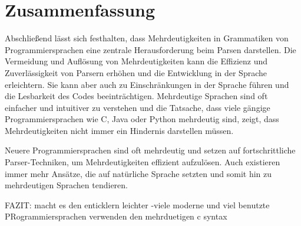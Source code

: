 \documentclass[runningheads]{llncs}
\begin{document}
	\section{Zusammenfassung}\label{sec:zusammenfassung}

	Abschließend lässt sich festhalten, dass Mehrdeutigkeiten in Grammatiken von Programmiersprachen
	eine zentrale Herausforderung beim Parsen darstellen.
	Die Vermeidung und Auflösung von Mehrdeutigkeiten kann die Effizienz und Zuverlässigkeit von Parsern erhöhen
	und die Entwicklung in der Sprache erleichtern.
	Sie kann aber auch zu Einschränkungen in der Sprache führen und die Lesbarkeit des Codes beeinträchtigen.
	Mehrdeutige Sprachen sind oft einfacher und intuitiver zu verstehen
	und die Tatsache, dass viele gängige Programmiersprachen wie C, Java oder Python mehrdeutig sind,
	zeigt, dass Mehrdeutigkeiten nicht immer ein Hindernis darstellen müssen.

	Neuere Programmiersprachen sind oft mehrdeutig und setzen auf fortschrittliche Parser-Techniken,
	um Mehrdeutigkeiten effizient aufzulösen.
	Auch existieren immer mehr Ansätze, die auf natürliche Sprache setzten
	und somit hin zu mehrdeutigen Sprachen tendieren.

	FAZIT: macht es den enticklern leichter
	-viele moderne und viel benutzte PRogrammiersprachen verwenden den mehrduetigen c syntax


%
%
%


	\nocite{*}
	
	
\end{document}
